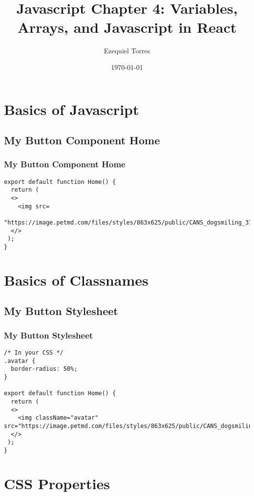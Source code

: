 \documentclass{beamer}
\begin{document}
\title{Javascript Chapter 4: Variables, Arrays, and Javascript in React}
\author{Ezequiel Torres}
\date{\today}
\frame{\titlepage}

\section{Basics of Javascript}

\begin{frame}[fragile]
\subsection{My Button Component Home}
\frametitle{My Button Component Home}
\begin{lstlisting}
export default function Home() {
  return (
  <>
    <img src=
    "https://image.petmd.com/files/styles/863x625/public/CANS_dogsmiling_379727605.jpg"/>
  </>
 );
}
\end{lstlisting}
\end{frame}

\section{Basics of Classnames}

\begin{frame}[fragile]
\subsection{My Button Stylesheet}
\frametitle{My Button Stylesheet}
\begin{lstlisting}
/* In your CSS */
.avatar {
  border-radius: 50%;
}

export default function Home() {
  return (
  <>
    <img className="avatar" src="https://image.petmd.com/files/styles/863x625/public/CANS_dogsmiling_379727605.jpg"/>
  </>
 );
}
\end{lstlisting}
\end{frame}

\section{CSS Properties}
\end{document}
